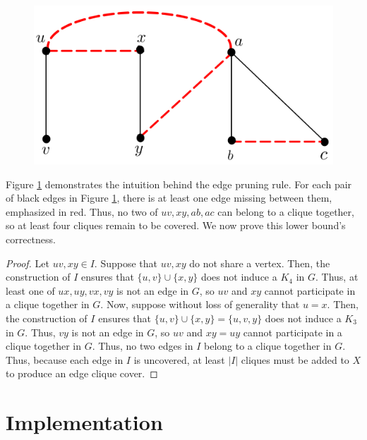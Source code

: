 \documentclass[12pt]{article}
\begin{document}
    \begin{figure}[hbt!]
        \begin{center}\includegraphics[scale=.7]{7.png}\end{center}
            \caption{}
        \label{fig:edgerule}
    \end{figure}
    
    Figure \ref{fig:edgerule} demonstrates the intuition behind the edge pruning rule.
    For each pair of black edges in Figure \ref{fig:edgerule}, there is at least one edge missing between them, emphasized in red.
    Thus, no two of $uv, xy, ab, ac$ can belong to a clique together, so at least four cliques remain to be covered.
    We now prove this lower bound's correctness.
    \begin{proof}
        Let $uv, xy \in I$.
        Suppose that $uv, xy$ do not share a vertex.
        Then, the construction of $I$ ensures that $\{u, v\} \cup \{x, y\}$ does not induce a $K_4$ in $G$.
        Thus, at least one of $ux, uy, vx, vy$ is not an edge in $G$, so $uv$ and $xy$ cannot participate in a clique together in $G$.
        Now, suppose without loss of generality that $u = x$.
        Then, the construction of $I$ ensures that $\{u, v\} \cup \{x, y\} = \{u, v, y\}$ does not induce a $K_3$ in $G$.
        Thus, $vy$ is not an edge in $G$, so $uv$ and $xy = uy$ cannot participate in a clique together in $G$.
        Thus, no two edges in $I$ belong to a clique together in $G$.
        Thus, because each edge in $I$ is uncovered, at least $|I|$ cliques must be added to $X$ to produce an edge clique cover.
    \end{proof}

\section*{Implementation}
\end{document}
